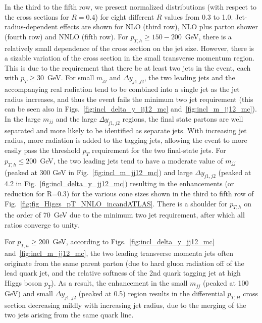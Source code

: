 \documentclass[10pt,prd,fleqn,superscriptaddress,notitlepage,nofootinbib,preprintnumbers,nobalancelastpage]{revtex4-1}
\begin{document}
In the third to the fifth row, we present  normalized distributions (with respect to the cross sections for $R=0.4$) for eight different $R$ values from 0.3 to 1.0.  Jet-radius-dependent effects are shown for NLO (third row), NLO plus parton shower (fourth row) and NNLO (fifth row). For $p_{T,h}\ge 150-200$~GeV, there is a relatively small dependence of the cross section on the jet size. However, there is a sizable variation of the cross section in the small transverse momentum region. This is due to the requirement that there be at least two jets  in the event, each with $p_T \ge 30$~GeV.
For small $m_{jj}$ and  $\Delta  y_{j1,j2}$, the two leading jets and the accompanying real radiation tend to be combined into a single jet as the jet radius increases, and thus the event fails the minimum two jet requirement (this can be seen also in Figs.~\ref{fig:incl_delta_y_jj12_mc} and~\ref{fig:incl_m_jj12_mc}). In the large $m_{jj}$ and the large $\Delta y_{j1,j2}$ regions, the final state partons are well separated and more likely to be identified as separate jets.
With increasing jet radius, more radiation is added to the tagging jets, allowing the event to more easily pass the threshold $p_T$ requirement for the two final-state jets.
For $p_{T,h}\le 200$~GeV, the two leading jets tend to have
a moderate value of  $m_{jj}$ (peaked at 300 GeV in Fig.~\ref{fig:incl_m_jj12_mc}) and large $\Delta  y_{j1,j2}$ (peaked at 4.2 in Fig.~\ref{fig:incl_delta_y_jj12_mc}) resulting in the enhancements (or reduction for R=0.3) for the various cone sizes shown in the third to fifth row of Fig.~\ref{fig:fig_Higgs_pT_NNLO_incandATLAS}.
There is a shoulder for $p_{T,h}$ on the order of 70~GeV due to the minimum two jet requirement, after which all ratios converge to unity.

For $p_{T,h}\ge 200$~GeV, according to Figs.~\ref{fig:incl_delta_y_jj12_mc} and~\ref{fig:incl_m_jj12_mc}, the two leading  transverse momenta jets often originate from the same parent parton (due to hard gluon radiation off of the lead quark jet, and the relative softness of the 2nd quark tagging jet at high Higgs boson $p_T$).  As a result, the enhancement in the small $m_{jj}$ (peaked at 100 GeV) and small $\Delta y_{j1,j2}$ (peaked at 0.5) region results in the  differential $p_{T,H}$ cross section  decreasing mildly with increasing jet radius, due to the merging of the two jets arising from the same quark line.
\end{document}
